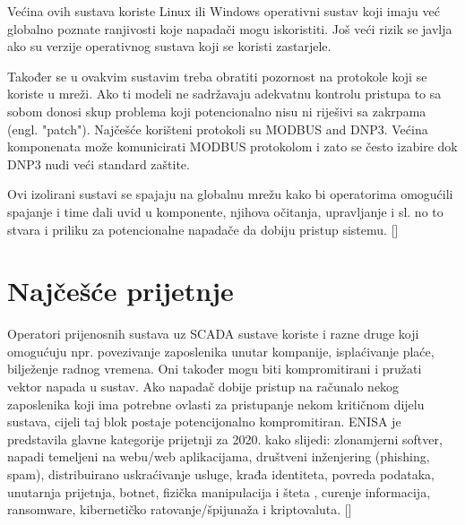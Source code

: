 \documentclass[times, utf8, zavrsni]{fer}
\begin{document}
Većina ovih sustava koriste Linux ili Windows operativni sustav koji imaju već globalno poznate ranjivosti koje napadači mogu iskoristiti. 
Još veći rizik se javlja ako su verzije operativnog sustava koji se koristi zastarjele.

Također se u ovakvim sustavim treba obratiti pozornost na protokole koji se koriste u mreži. Ako ti modeli ne sadržavaju adekvatnu kontrolu pristupa to sa sobom donosi skup problema koji potencionalno nisu ni riješivi sa zakrpama (engl. "patch"). Najčešće korišteni protokoli su MODBUS and DNP3. Većina komponenata može komunicirati MODBUS protokolom i zato se često izabire dok DNP3 nudi veći standard zaštite.

Ovi izolirani sustavi se spajaju na globalnu mrežu kako bi operatorima omogućili spajanje i time dali uvid u komponente, njihova očitanja, upravljanje i sl. no to stvara i priliku za potencionalne napadače da dobiju pristup sistemu.
[\cite{scada-thesis}]

\section{Najčešće prijetnje}
Operatori prijenosnih sustava uz SCADA sustave koriste i razne druge koji omogućuju npr. povezivanje zaposlenika unutar kompanije, isplaćivanje plaće, bilježenje radnog vremena. Oni također mogu biti kompromitirani i pružati vektor napada u sustav. Ako napadač dobije pristup na računalo nekog zaposlenika koji ima potrebne ovlasti za pristupanje nekom kritičnom dijelu sustava, cijeli taj blok postaje potencijonalno kompromitiran. 
ENISA je predstavila glavne kategorije prijetnji za 2020. kako slijedi: zlonamjerni softver, napadi temeljeni na webu/web aplikacijama, društveni inženjering (phishing, spam), distribuirano uskraćivanje usluge, krađa identiteta, povreda podataka, unutarnja prijetnja, botnet, fizička manipulacija i šteta , curenje informacija, ransomware, kibernetičko ratovanje/špijunaža i kriptovaluta.
 [\cite{tso-vuln}]
\end{document}
